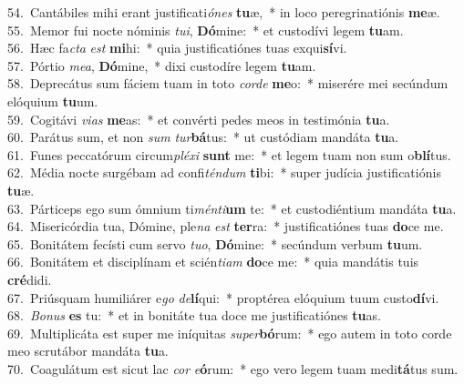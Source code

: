 {54.~}Cantábiles mihi erant justificati\textit{ó}\textit{nes} \textbf{tu}æ,~* in loco peregrinatiónis \textbf{me}æ.\\
{55.~}Memor fui nocte nóminis \textit{tu}\textit{i}, \textbf{Dó}mine:~* et custodívi legem \textbf{tu}am.\\
{56.~}Hæc fa\textit{cta} \textit{est} \textbf{mi}hi:~* quia justificatiónes tuas exqui\textbf{sí}vi.\\
{57.~}Pórtio \textit{me}\textit{a}, \textbf{Dó}mine,~* dixi custodíre legem \textbf{tu}am.\\
{58.~}Deprecátus sum fáciem tuam in toto \textit{cor}\textit{de} \textbf{me}o:~* miserére mei secúndum elóquium \textbf{tu}um.\\
{59.~}Cogitávi \textit{vi}\textit{as} \textbf{me}as:~* et convérti pedes meos in testimónia \textbf{tu}a.\\
{60.~}Parátus sum, et non \textit{sum} \textit{tur}\textbf{bá}tus:~* ut custódiam mandáta \textbf{tu}a.\\
{61.~}Funes peccatórum circum\textit{plé}\textit{xi} \textbf{sunt} me:~* et legem tuam non sum o\textbf{blí}tus.\\
{62.~}Média nocte surgébam ad confi\textit{tén}\textit{dum} \textbf{ti}bi:~* super judícia justificatiónis \textbf{tu}æ.\\
{63.~}Párticeps ego sum ómnium ti\textit{mén}\textit{ti}\textbf{um} te:~* et custodiéntium mandáta \textbf{tu}a.\\
{64.~}Misericórdia tua, Dómine, ple\textit{na} \textit{est} \textbf{ter}ra:~* justificatiónes tuas \textbf{do}ce me.\\
{65.~}Bonitátem fecísti cum servo \textit{tu}\textit{o}, \textbf{Dó}mine:~* secúndum verbum \textbf{tu}um.\\
{66.~}Bonitátem et disciplínam et scién\textit{ti}\textit{am} \textbf{do}ce me:~* quia mandátis tuis \textbf{cré}didi.\\
{67.~}Priúsquam humiliárer e\textit{go} \textit{de}\textbf{lí}qui:~* proptérea elóquium tuum custo\textbf{dí}vi.\\
{68.~}\textit{Bo}\textit{nus} \textbf{es} tu:~* et in bonitáte tua doce me justificatiónes \textbf{tu}as.\\
{69.~}Multiplicáta est super me iníquitas \textit{su}\textit{per}\textbf{bó}rum:~* ego autem in toto corde meo scrutábor mandáta \textbf{tu}a.\\
{70.~}Coagulátum est sicut lac \textit{cor} \textit{e}\textbf{ó}rum:~* ego vero legem tuam medi\textbf{tá}tus sum.\\
